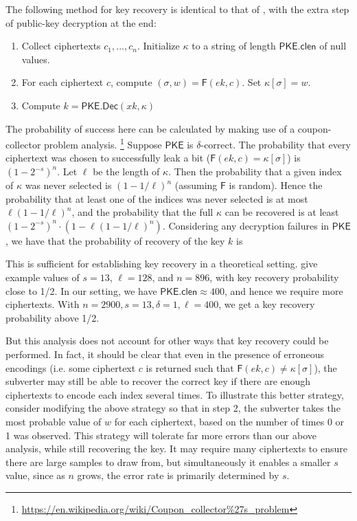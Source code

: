 The following method for key recovery is identical to that of \cite{CCS:BelJaeKan15}, with the extra step of public-key decryption at the end:
\begin{enumerate}\itemsep0em
\item Collect ciphertexts $c_1,...,c_n$. Initialize $\kappa$ to a string of length $\mathsf{PKE.clen}$ of null values. 
\item For each ciphertext $c$, compute $(\sigma, w) = \mathsf{F}(ek, c)$. Set $\kappa[\sigma]=w$.
\item Compute $k = \mathsf{PKE.Dec}(xk, \kappa)$
\end{enumerate}

The probability of success here can be calculated by making use of a coupon-collector problem analysis. \footnote{\url{https://en.wikipedia.org/wiki/Coupon_collector\%27s_problem}} Suppose $\mathsf{PKE}$ is $\delta$-correct. The probability that every ciphertext was chosen to successfully leak a bit ($\mathsf{F}(ek, c) = \kappa[\sigma]$) is $(1-2^{-s})^n$. Let $\ell$ be the length of $\kappa$. Then the probability that a given index of $\kappa$ was never selected is $(1-1/\ell)^n$ (assuming $\mathsf{F}$ is random). Hence the probability that at least one of the indices was never selected is at most $\ell (1-1/\ell)^n$, and the probability that the full $\kappa$ can be recovered is at least $(1-2^{-s})^n\cdot (1-\ell (1-1/\ell)^n)$. Considering any decryption failures in $\mathsf{PKE}$, we have that the probability of recovery of the key $k$ is

This is sufficient for establishing key recovery in a theoretical setting. \cite{CCS:BelJaeKan15} give example values of $s=13$, $\ell=128$, and $n=896$, with key recovery probability close to 1/2. In our setting, we have $\mathsf{PKE.clen}\approx 400$, and hence we require more ciphertexts. With $n=2900,s=13,\delta=1,\ell=400$, we get a key recovery probability above 1/2.

But this analysis does not account for other ways that key recovery could be performed. In fact, it should be clear that even in the presence of erroneous encodings (i.e. some ciphertext $c$ is returned such that $\mathsf{F}(ek, c) \not = \kappa[\sigma]$), the subverter may still be able to recover the correct key if there are enough ciphertexts to encode each index several times. To illustrate this better strategy, consider modifying the above strategy so that in step 2, the subverter takes the most probable value of $w$ for each ciphertext, based on the number of times 0 or 1 was observed. This strategy will tolerate far more errors than our above analysis, while still recovering the key. It may require many ciphertexts to ensure there are large samples to draw from, but simultaneously it enables a smaller $s$ value, since as $n$ grows, the error rate is primarily determined by $s$.

